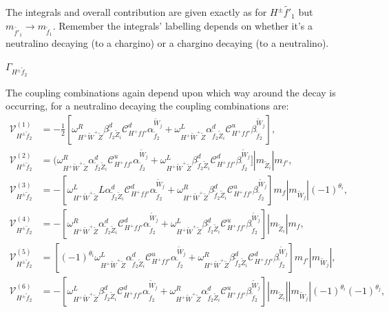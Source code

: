 \documentclass[final,3p,times]{elsarticle}
\begin{document}
The integrals and overall contribution are given exactly as for $H^{\pm} \tilde{f'}_1$ but $m_{\tilde{f'}_1} \rightarrow m_{\tilde{f}_1}$. Remember the integrals' labelling depends on whether it's a neutralino decaying (to a chargino) or a chargino decaying (to a neutralino).

\textbf{\underline{$\Gamma_{H^{\pm} \tilde{f}_2}$}}

The coupling combinations again depend upon which way around the decay is occurring, for a neutralino decaying the coupling combinations are:
\begin{align}
\mathcal{V}_{H^{\pm} \tilde{f}_2}^{(1)} &= -\frac{1}{2}[\omega_{H^+ \tilde{W}^+ \tilde{Z}}^R \beta_{\tilde{f}_2 \tilde{Z}_i}^{d} \mathcal{C}_{H^+ f f'}^d \alpha_{\tilde{f}_2}^{\tilde{W}_j} + \omega_{H^+ \tilde{W}^+ \tilde{Z}}^L \alpha_{\tilde{f}_2 \tilde{Z}_i}^{d} \mathcal{C}_{H^+ f f'}^u \beta_{\tilde{f}_2}^{\tilde{W}_j}], \\
\mathcal{V}_{H^{\pm} \tilde{f}_2}^{(2)} &= (\omega_{H^+ \tilde{W}^+ \tilde{Z}}^R \alpha_{\tilde{f}_2 \tilde{Z}_i}^{d} \mathcal{C}_{H^+ f f'}^u \alpha_{\tilde{f}_2}^{\tilde{W}_j} + \omega_{H^+ \tilde{W}^+ \tilde{Z}}^L \beta_{\tilde{f}_2 \tilde{Z}_i}^{d} \mathcal{C}_{H^+ f f'}^d \beta_{\tilde{f}_2}^{\tilde{W}_j}]|m_{\tilde{Z}_i}|m_{f'}, \\
\mathcal{V}_{H^{\pm} \tilde{f}_2}^{(3)} &= -[\omega_{H^+ \tilde{W}^+ \tilde{Z}}^LL \alpha_{\tilde{f}_2 \tilde{Z}_i}^{d} \mathcal{C}_{H^+ f f'}^d \alpha_{\tilde{f}_2}^{\tilde{W}_j} + \omega_{H^+ \tilde{W}^+ \tilde{Z}}^R \beta_{\tilde{f}_2 \tilde{Z}_i}^{d} \mathcal{C}_{H^+ f f'}^u \beta_{\tilde{f}_2}^{\tilde{W}_j}]m_{f}|m_{\tilde{W}_j}|(-1)^{\theta_i}, \\
\mathcal{V}_{H^{\pm} \tilde{f}_2}^{(4)} &= -[\omega_{H^+ \tilde{W}^+ \tilde{Z}}^R \alpha_{\tilde{f}_2 \tilde{Z}_i}^{d} \mathcal{C}_{H^+ f f'}^d \alpha_{\tilde{f}_2}^{\tilde{W}_j} + \omega_{H^+ \tilde{W}^+ \tilde{Z}}^L \beta_{\tilde{f}_2 \tilde{Z}_i}^{d} \mathcal{C}_{H^+ f f'}^u \beta_{\tilde{f}_2}^{\tilde{W}_j}]|m_{\tilde{Z}_i}|m_{f}, \\
\mathcal{V}_{H^{\pm} \tilde{f}_2}^{(5)} &= [(-1)^{\theta_i}\omega_{H^+ \tilde{W}^+ \tilde{Z}}^L \alpha_{\tilde{f}_2 \tilde{Z}_i}^{d} \mathcal{C}_{H^+ f f'}^u \alpha_{\tilde{f}_2}^{\tilde{W}_j} + \omega_{H^+ \tilde{W}^+ \tilde{Z}}^R \beta_{\tilde{f}_2 \tilde{Z}_i}^{d} \mathcal{C}_{H^+ f f'}^d \beta_{\tilde{f}_2}^{\tilde{W}_j}]m_{f'}|m_{\tilde{W}_j}|, \\
\mathcal{V}_{H^{\pm} \tilde{f}_2}^{(6)} &= -[\omega_{H^+ \tilde{W}^+ \tilde{Z}}^L \beta_{\tilde{f}_2 \tilde{Z}_i}^{d} \mathcal{C}_{H^+ f f'}^d \alpha_{\tilde{f}_2}^{\tilde{W}_j} + \omega_{H^+ \tilde{W}^+ \tilde{Z}}^R \alpha_{\tilde{f}_2 \tilde{Z}_i}^{d} \mathcal{C}_{H^+ f f'}^u \beta_{\tilde{f}_2}^{\tilde{W}_j}]|m_{\tilde{Z}_i}||m_{\tilde{W}_j}|(-1)^{\theta_i}(-1)^{\theta_j}, \\

\end{align}
\end{document}
